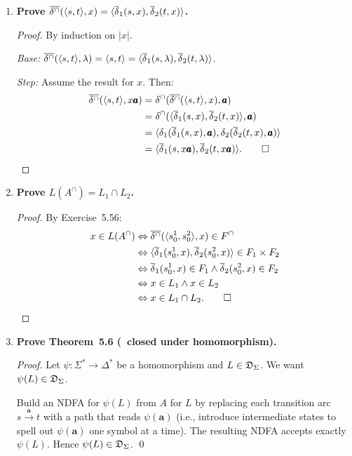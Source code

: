 \begin{enumerate}[{5.}1. ]
\item \textbf{Prove $\overline{\delta^\cap}(\langle s,t\rangle,x)=\langle\overline{\delta}_1(s,x),\overline{\delta}_2(t,x)\rangle$.}

\begin{proof}
By induction on $|x|$.

\emph{Base:}  $\overline{\delta^\cap}(\langle s,t\rangle,\lambda)=\langle s,t\rangle=\langle\overline{\delta}_1(s,\lambda),\overline{\delta}_2(t,\lambda)\rangle$.

\emph{Step:}  Assume the result for $x$.  Then:
\begin{align*}
  \overline{\delta^\cap}(\langle s,t\rangle,x\pmb{a})
  &=\delta^\cap(\overline{\delta^\cap}(\langle s,t\rangle,x),\pmb{a}) \\
  &=\delta^\cap(\langle\overline{\delta}_1(s,x),\overline{\delta}_2(t,x)\rangle,\pmb{a}) \\
  &=\langle\delta_1(\overline{\delta}_1(s,x),\pmb{a}),\delta_2(\overline{\delta}_2(t,x),\pmb{a})\rangle \\
  &=\langle\overline{\delta}_1(s,x\pmb{a}),\overline{\delta}_2(t,x\pmb{a})\rangle. \qed
\end{align*}
\end{proof}

\item \textbf{Prove $L(A^\cap)=L_1\cap L_2$.}

\begin{proof}
By Exercise~5.56:
\begin{align*}
  x\in L(A^\cap)
  &\Leftrightarrow\overline{\delta^\cap}(\langle s^1_0,s^2_0\rangle,x)\in F^\cap \\
  &\Leftrightarrow\langle\overline{\delta}_1(s^1_0,x),\overline{\delta}_2(s^2_0,x)\rangle\in F_1\times F_2 \\
  &\Leftrightarrow\overline{\delta}_1(s^1_0,x)\in F_1\wedge\overline{\delta}_2(s^2_0,x)\in F_2 \\
  &\Leftrightarrow x\in L_1\wedge x\in L_2 \\
  &\Leftrightarrow x\in L_1\cap L_2. \qed
\end{align*}
\end{proof}

\item \textbf{Prove Theorem~5.6 (\DSIG\ closed under homomorphism).}

\begin{proof}
Let $\psi:\Sigma^*\to\Delta^*$ be a homomorphism and $L\in\mathfrak{D}_\Sigma$.  We want $\psi(L)\in\mathfrak{D}_\Sigma$.

Build an NDFA for $\psi(L)$ from $A$ for $L$ by replacing each transition arc $s\xrightarrow{\pmb{a}}t$ with a path that reads $\psi(\pmb{a})$ (i.e., introduce intermediate states to spell out $\psi(\pmb{a})$ one symbol at a time).  The resulting NDFA accepts exactly $\psi(L)$.  Hence $\psi(L)\in\mathfrak{D}_\Sigma$. \qed
\end{proof}


\end{enumerate}
